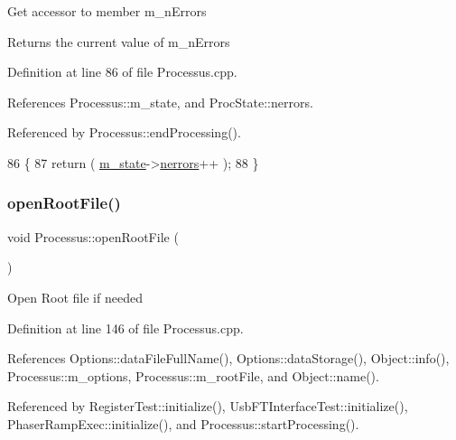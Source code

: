Get accessor to member m\+\_\+n\+Errors \begin{DoxyReturn}{Returns}
the current value of m\+\_\+n\+Errors 
\end{DoxyReturn}


Definition at line 86 of file Processus.\+cpp.



References Processus\+::m\+\_\+state, and Proc\+State\+::nerrors.



Referenced by Processus\+::end\+Processing().


\begin{DoxyCode}
86                                 \{
87   \textcolor{keywordflow}{return} ( \hyperlink{classProcessus_ab3539eee42891ceae0baf4395ae7fb61}{m\_state}->\hyperlink{structProcState_a51a0f54ba62b07e07ac8518c5f32828d}{nerrors}++ );
88 \}
\end{DoxyCode}
\mbox{\label{classProcessus_aacf6812880c1d1a2bf14a4a39458f443}} 
\subsubsection{\texorpdfstring{open\+Root\+File()}{openRootFile()}}
{\footnotesize\ttfamily void Processus\+::open\+Root\+File (\begin{DoxyParamCaption}{ }\end{DoxyParamCaption})\hspace{0.3cm}{\ttfamily [inherited]}}

Open Root file if needed 

Definition at line 146 of file Processus.\+cpp.



References Options\+::data\+File\+Full\+Name(), Options\+::data\+Storage(), Object\+::info(), Processus\+::m\+\_\+options, Processus\+::m\+\_\+root\+File, and Object\+::name().



Referenced by Register\+Test\+::initialize(), Usb\+F\+T\+Interface\+Test\+::initialize(), Phaser\+Ramp\+Exec\+::initialize(), and Processus\+::start\+Processing().


